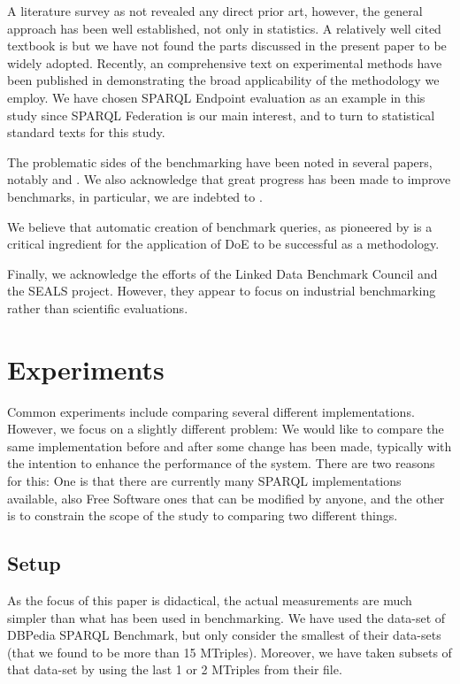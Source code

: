 \documentclass{llncs}
\begin{document}
A literature survey as not revealed any direct prior art, however, the
general approach has been well established, not only in statistics. A
relatively well cited textbook is \cite{citeulike:5190414} but we have
not found the parts discussed in the present paper to be widely
adopted. Recently, an comprehensive text on experimental methods have
been published in
\cite{Springer-2010-Experimental-Methods-for-the-Analysis-of-Optimization-Algorithms}
demonstrating the broad applicability of the methodology we employ.
We have chosen SPARQL Endpoint evaluation as an example in this study
since SPARQL Federation is our main interest, and to turn to
statistical standard texts \cite{wu2009experiments} for this study.

The problematic sides of the benchmarking have been noted in several
papers, notably \cite{Duan:2011:AOC:1989323.1989340} and
\cite{MontoyaVCRA12}. We also acknowledge that great
progress has been made to improve benchmarks, in particular, we are
indebted to \cite{mxro:Morsey2011DBpedia}. 

We believe that automatic creation of benchmark queries, as
pioneered by \cite{goerlitz2012splodge} is a critical ingredient for
the application of DoE to be successful as a methodology.

Finally, we acknowledge the efforts of the Linked Data Benchmark
Council and the SEALS project. However, they appear to focus on
industrial benchmarking rather than scientific evaluations. 

\section{Experiments}

Common experiments include comparing several different
implementations. However, we focus on a slightly different problem: We
would like to compare the same implementation before and after some
change has been made, typically with the intention to enhance the
performance of the system. There are two reasons for this: One is that
there are currently many SPARQL implementations available, also Free
Software ones that can be modified by anyone, and the other is to
constrain the scope of the study to comparing two different things.

\subsection{Setup}

As the focus of this paper is didactical, the actual measurements are
much simpler than what has been used in benchmarking. We have used the
data-set of DBPedia SPARQL Benchmark\cite{mxro:Morsey2011DBpedia}, but only consider the
smallest of their data-sets (that we found to be more than 15
MTriples). Moreover, we have taken subsets of that data-set by using
the last 1 or 2 MTriples from their file.
\end{document}
